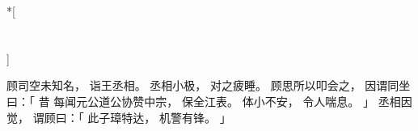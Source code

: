 
\switchcolumn[0]*[\section{}]

顾司空未知名，
诣王丞相。
丞相小极，
对之疲睡。
顾思所以叩会之，
因谓同坐曰：「
    昔
    每闻元公道公协赞中宗，
    保全江表。
    体小不安，
    令人喘息。
」
丞相因觉，
谓顾曰：「
    此子璋特达，
    机警有锋。
」

\switchcolumn


